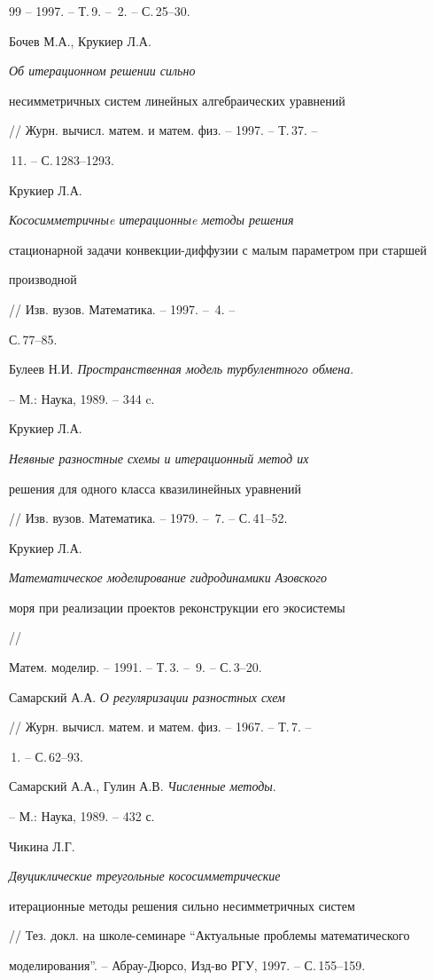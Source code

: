 \begin{thebibliography}{99}
-- 1997. -- Т.\,9. -- \No\,2. -- С.\,25--30. 




Бочев М.А., Крукиер Л.А. {\em Об итерационном решении сильно 


несимметричных систем линейных алгебраических уравнений} 


// Журн. вычисл. матем. и матем. физ. -- 1997. -- Т.\,37. -- 


\No\,11. -- С.\,1283--1293. 




Крукиер Л.А. {\em Кососимметричныe итерационныe методы решения 


стационарной задачи конвекции-диффузии с малым параметром при старшей 


производной} // Изв. вузов. Математика. -- 1997. -- \No\,4. -- 


С.\,77--85. 




Булеев Н.И. {\em Пространственная модель турбулентного обмена}. 


-- М.: Наука, 1989. -- 344 c. 




Крукиер Л.А. {\em Неявные разностные схемы и итерационный метод их 


решения для одного класса квазилинейных уравнений} 


// Изв. вузов. Математика. -- 1979. -- \No\,7. -- С.\,41--52. 




Крукиер Л.А. {\em Математическое моделирование гидродинамики Азовского 


моря при реализации проектов реконструкции его экосистемы} // 


Матем. моделир. -- 1991. -- Т.\,3. -- \No\,9. -- С.\,3--20. 




Самарский А.А. {\em О регуляризации разностных схем} 


// Журн. вычисл. матем. и матем. физ. -- 1967. -- Т.\,7. -- 


\No\,1. -- С.\,62--93. 




Самарский А.А., Гулин А.В. {\em Численные методы}. 


-- М.: Наука, 1989. -- 432 с. 




Чикина Л.Г. {\em Двуциклические треугольные кососимметрические 


итерационные методы решения сильно несимметричных систем} 


// Тез. докл. на школе-семинаре ``Актуальные проблемы математического 


моделирования''. -- Абрау-Дюрсо, Изд-во РГУ, 1997. -- С.\,155--159. 


 


\end{thebibliography} 


